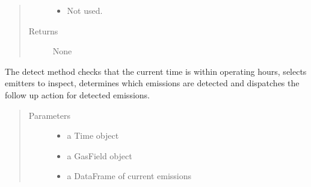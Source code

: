 \documentclass[letterpaper,10pt,english]{sphinxmanual}
\begin{document}
\begin{fulllineitems}
\begin{fulllineitems}
\begin{quote}
\begin{description}
\begin{itemize}
\item {} 
 \textendash{} Not used.

\end{itemize}

\item[{Returns}] \leavevmode
None

\end{description}\end{quote}

\end{fulllineitems}


\begin{fulllineitems}
\label{\detokenize{index:feast.DetectionModules.comp_survey.CompSurvey.detect}}
The detect method checks that the current time is within operating hours, selects emitters to inspect,
determines which emissions are detected and dispatches the follow up action for detected emissions.
\begin{quote}\begin{description}
\item[{Parameters}] \leavevmode\begin{itemize}
\item {} 
 \textendash{} a Time object

\item {} 
 \textendash{} a GasField object

\item {} 
 \textendash{} a DataFrame of current emissions

\end{itemize}

\end{description}\end{quote}

\end{fulllineitems}



\end{fulllineitems}
\end{document}
